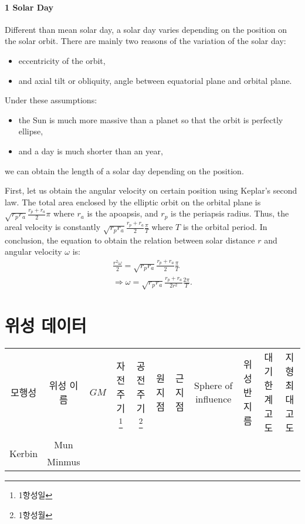 \paragraph{1 Solar Day}
Different than mean solar day, a solar day varies depending on the position on the solar orbit.
There are mainly two reasons of the variation of the solar day:
\begin{itemize}
\item eccentricity of the orbit, 
\item and axial tilt or obliquity, angle between equatorial plane and orbital plane.
\end{itemize}

Under these assumptions:
\begin{itemize}
\item the Sun is much more massive than a planet so that the orbit is perfectly ellipse,
\item and a day is much shorter than an year,
\end{itemize}
we can obtain the length of a solar day depending on the position.

First, let us obtain the angular velocity on certain position using Keplar's second law.
The total area enclosed by the elliptic orbit on the orbital plane is $\sqrt{r_p r_a}\frac{r_p+r_a}{2}\pi$ where $r_a$ is the apoapsis, and $r_p$ is the periapsis radius. Thus, the areal velocity is constantly $\sqrt{r_p r_a}\frac{r_p+r_a}{2}\frac{\pi}{T}$ where $T$ is the orbital period. In conclusion, the equation to obtain the relation between solar distance $r$ and angular velocity $\omega$ is:
\begin{align}
\frac{r^2 \omega}{2} = \sqrt{r_p r_a}\frac{r_p+r_a}{2}\frac{\pi}{T}
\\\nonumber\Rightarrow \omega = \sqrt{r_p r_a}\frac{r_p+r_a}{2r^2}\frac{2\pi}{T}.
\end{align}



\section{위성 데이터}

\begin{tabular}{|c|c|c|c|c|c|c|c|c|c|c|}
모행성&위성 이름& $GM$& 자전주기\footnote{1항성일}& 공전주기\footnote{1항성월}& 원지점&근지점&Sphere of influence&위성 반지름& 대기한계고도 & 지형 최대고도
\\
\multirow{2}{*}{Kerbin}& Mun
\\&Minmus
\end{tabular}
